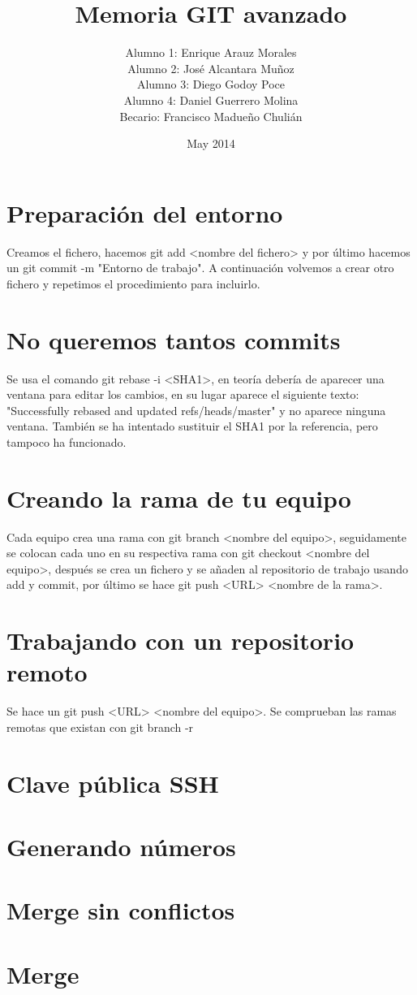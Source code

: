 \documentclass{article}
\title{Memoria GIT avanzado}
\author{Alumno 1: Enrique Arauz Morales\\
        Alumno 2: José Alcantara Muñoz\\
        Alumno 3: Diego Godoy Poce\\
        Alumno 4: Daniel Guerrero Molina\\
        Becario: Francisco Madueño Chulián}
\date{May 2014}
\begin{document}
\maketitle

\section{Preparación del entorno}
Creamos el fichero, hacemos git add <nombre del fichero> y por último hacemos un git commit -m "Entorno de trabajo". A continuación volvemos a crear otro fichero y repetimos el procedimiento para incluirlo.
\section{No queremos tantos commits}
Se usa el comando git rebase -i <SHA1>, en teoría debería de aparecer una ventana para editar los cambios, en su lugar aparece el siguiente texto: "Successfully rebased and updated refs/heads/master" y no aparece ninguna ventana. También se ha intentado sustituir el SHA1 por la referencia, pero tampoco ha funcionado.
\section{Creando la rama de tu equipo}
Cada equipo crea una rama con git branch <nombre del equipo>, seguidamente se colocan cada uno en su respectiva rama con git checkout <nombre del equipo>, después se crea un fichero y se añaden al repositorio de trabajo usando add y commit, por último se hace git push <URL> <nombre de la rama>.
\section{Trabajando con un repositorio remoto}
Se hace un git push <URL> <nombre del equipo>. Se comprueban las ramas remotas que existan con git branch -r
\section{Clave pública SSH}
\section{Generando números}
\section{Merge sin conflictos}
\section{Merge}
\end{document}
